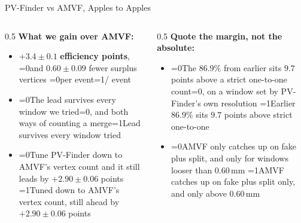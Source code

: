 \documentclass[xcolor=table,aspectratio=169]{beamer}
\providecommand{\talkbuild}{0}
\newcommand{\readingonly}[1]{\ifnum\talkbuild=0\relax#1\fi}
\newcommand{\talkonly}[1]{\ifnum\talkbuild=1\relax#1\fi}
\begin{document}
\begin{frame}{PV-Finder vs AMVF, Apples to Apples}
    \begin{columns}[t]
        \begin{column}{0.5\linewidth}
            \footnotesize
            \textbf{What we gain over AMVF:}
            \begin{itemize}\setlength\itemsep{0.3em}
                \item \textcolor{pennred}{$\mathbf{+3.4 \pm 0.1}$ \textbf{efficiency
                    points}}, \readingonly{and }$\mathbf{0.60 \pm 0.09}$ fewer surplus
                    vertices \readingonly{per event}\talkonly{/ event}
                \item \readingonly{The lead survives every window we tried\readingonly{, and both
                    ways of counting a merge}}\talkonly{Lead survives every window
                    tried}
                \item \readingonly{Tune PV-Finder down to AMVF's vertex count and it still leads by
                    $+2.90 \pm 0.06$ points}%
                    \talkonly{Tuned down to AMVF's vertex count, still ahead by
                    $+2.90 \pm 0.06$ points}
            \end{itemize}
        \end{column}
        \begin{column}{0.5\linewidth}
            \footnotesize
            \textbf{Quote the margin, not the absolute:}
            \begin{itemize}\setlength\itemsep{0.3em}
                \item \readingonly{The $86.9\%$ from earlier sits $9.7$ points above a strict
                    one-to-one count\readingonly{, on a window set by PV-Finder's own
                    resolution}}%
                    \talkonly{Earlier $86.9\%$ sits $9.7$ points above strict
                    one-to-one}
                \item \readingonly{AMVF only catches up on fake plus split, and only for windows
                    looser than $0.60$\,mm}%
                    \talkonly{AMVF catches up on fake plus split only, and only above
                    $0.60$\,mm}
            \end{itemize}
        \end{column}
    \end{columns}
\end{frame}
\end{document}
